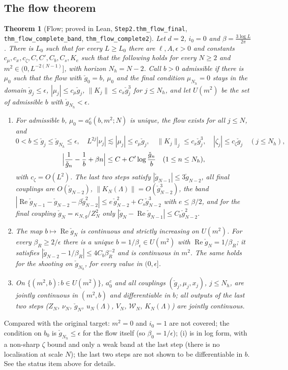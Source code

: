 \documentclass[11pt]{amsart}
\newtheorem{theorem}{Theorem}[section]
\theoremstyle{definition}
\theoremstyle{remark}
\numberwithin{equation}{section}
\begin{document}
\subsection{The flow theorem}
\begin{theorem}[Flow; proved in Lean, \texttt{Step2.thm\_flow\_final}, \texttt{thm\_flow\_complete\_band},
\texttt{thm\_flow\_complete2}]\label{thm:flow}
Let $d=2$, $i_0=0$ and $\beta=\frac{3\log L}{2\pi}$. There is $L_0$ such that for every $L\ge L_0$ there are
$\ell,A,\epsilon>0$ and constants $c_\mu,c_x,c_\zeta,C,C',C_b,C_s,K_e$ such that the following holds for every
$N\ge2$ and $m^2\in(0,L^{-2(N-1)}]$, with horizon $N_h=N-2$. Call $b>0$ \emph{admissible} if there is $\mu_0$
such that the flow with $\check g_0=b$, $\mu_0$ and the final condition $\mu_{N_h}=0$ stays in the domain
$\check g_j\le\epsilon$, $|\mu_j|\le c_\mu\check g_j$, $\|K_j\|\le c_x\check g_j^3$ for $j\le N_h$, and let
$U(m^2)$ be the set of admissible $b$ with $\check g_{N_h}<\epsilon$.
\begin{enumerate}[label=(\roman*)]
\item For admissible $b$, $\mu_0=a_0^c(b,m^2;N)$ is unique, the flow exists for all $j\le N$, and
  \[
    0<b\le\check g_j\le\check g_{N_h}\le\epsilon,\quad L^{2j}|\nu_j|\lesssim|\mu_j|\le c_\mu\check g_j,\quad
    \|K_j\|_j\le c_x\check g_j^3,\quad |\zeta_j|\le c_\zeta\check g_j\quad(j\le N_h),
  \]
  \[
    \Bigl|\frac1{\check g_n}-\frac1b+\beta n\Bigr|\le C+C'\log\frac{\check g_n}{b}\quad(1\le n\le N_h),
  \]
  with $c_\zeta=O(L^2)$. The last two steps satisfy $|\check g_{N-1}|\le3\check g_{N-2}$, all final couplings
  are $O(\check g_{N-2})$, $\|K_N(\Lambda)\|=O(\check g_{N-2}^3)$, the band
  $|\operatorname{Re}\check g_{N-1}-\check g_{N-2}-\beta\check g_{N-2}^2|\le e\,\check g_{N-2}^2+C_s\check g_{N-2}^3$
  with $e\le\beta/2$, and for the final coupling $\check g_N=\kappa_{N,g}/Z_N^2$ only
  $|\check g_N-\operatorname{Re}\check g_{N-1}|\le C_b\check g_{N-2}^2$.
\item The map $b\mapsto\operatorname{Re}\check g_N$ is continuous and strictly increasing on $U(m^2)$. For every
  $\beta_R\ge2/\epsilon$ there is a unique $b=1/\beta_\epsilon\in U(m^2)$ with $\operatorname{Re}\check g_N=1/\beta_R$; it
  satisfies $|\check g_{N-2}-1/\beta_R|\le4C_b\beta_R^{-2}$ and is continuous in $m^2$. The same holds for the
  shooting on $\check g_{N_h}$, for every value in $(0,\epsilon]$.
\item On $\{(m^2,b):b\in U(m^2)\}$, $a_0^c$ and all couplings $(\check g_j,\mu_j,x_j)$, $j\le N_h$, are jointly
  continuous in $(m^2,b)$ and differentiable in $b$; all outputs of the last two steps ($Z_N$, $\nu_N$,
  $\check g_N$, $u_N(\Lambda)$, $V_N$, $\mathcal W_N$, $K_N(\Lambda)$) are jointly continuous.
\end{enumerate}
\end{theorem}
Compared with the original target: $m^2=0$ and $i_0=1$ are not covered; the condition on $b_0$ is
$\check g_{N_h}\le\epsilon$ for the flow itself (so $\beta_0=1/\epsilon$); (i) is in log form, with a non-sharp
$\zeta$ bound and only a weak band at the last step (there is no localisation at scale $N$); the last two steps
are not shown to be differentiable in $b$. See the status item above for details.
\end{document}
